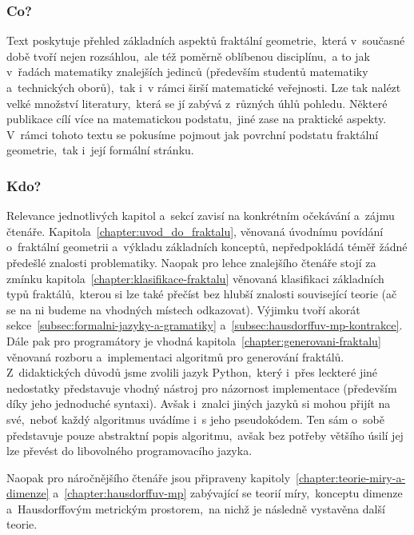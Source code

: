 \label{chapter:predmluva}

\subsubsection{Co?}

Text poskytuje přehled základních aspektů fraktální geometrie,~která v~současné době tvoří nejen rozsáhlou,~ale též poměrně oblíbenou disciplínu,~a to jak v~řadách matematiky znalejších jedinců (především studentů matematiky a~technických oborů),~tak i~v rámci širší matematické veřejnosti. Lze tak nalézt velké množství literatury,~která se jí zabývá z~různých úhlů pohledu. Některé publikace cílí více na matematickou podstatu,~jiné zase na praktické aspekty. V~rámci tohoto textu se pokusíme pojmout jak povrchní podstatu fraktální geometrie,~tak i~její formální stránku.

\subsubsection{Kdo?}

Relevance jednotlivých kapitol a~sekcí zavisí na konkrétním očekávání a~zájmu čtenáře. Kapitola~\ref{chapter:uvod_do_fraktalu}, věnovaná úvodnímu povídání o~fraktální geometrii a~výkladu základních konceptů, nepředpokládá téměř žádné předešlé znalosti problematiky. Naopak pro lehce znalejšího čtenáře stojí za zmínku kapitola~\ref{chapter:klasifikace-fraktalu} věnovaná klasifikaci základních typů fraktálů,~kterou si lze také přečíst bez hlubší znalosti související teorie (ač se na ni budeme na vhodných místech odkazovat). Výjimku tvoří akorát sekce~\ref{subsec:formalni-jazyky-a-gramatiky} a~\ref{subsec:hausdorffuv-mp-kontrakce}. Dále pak pro programátory je vhodná kapitola~\ref{chapter:generovani-fraktalu} věnovaná rozboru a~implementaci algoritmů pro generování fraktálů. Z~didaktických důvodů jsme zvolili jazyk Python,~který i~přes leckteré jiné nedostatky představuje vhodný nástroj pro názornost implementace (především díky jeho jednoduché syntaxi). Avšak i~znalci jiných jazyků si mohou přijít na své,~neboť každý algoritmus uvádíme i~s jeho pseudokódem. Ten sám o~sobě představuje pouze abstraktní popis algoritmu,~avšak bez potřeby většího úsilí jej lze převést do libovolného programovacího jazyka.

Naopak pro náročnějšího čtenáře jsou připraveny kapitoly~\ref{chapter:teorie-miry-a-dimenze} a~\ref{chapter:hausdorffuv-mp} zabývající se teorií míry,~konceptu dimenze a~Hausdorffovým metrickým prostorem,~na nichž je následně vystavěna další teorie.

